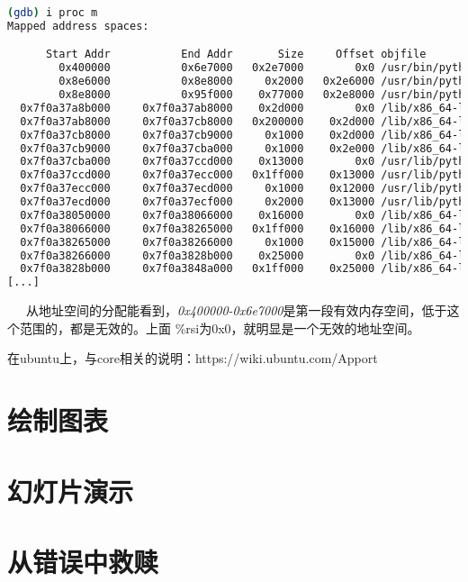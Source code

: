 \documentclass[12pt]{article}  %
\begin{document}
\begin{lstlisting}[language=sh]
(gdb) i proc m
Mapped address spaces:

      Start Addr           End Addr       Size     Offset objfile
        0x400000           0x6e7000   0x2e7000        0x0 /usr/bin/python2.7
        0x8e6000           0x8e8000     0x2000   0x2e6000 /usr/bin/python2.7
        0x8e8000           0x95f000    0x77000   0x2e8000 /usr/bin/python2.7
  0x7f0a37a8b000     0x7f0a37ab8000    0x2d000        0x0 /lib/x86_64-linux-gnu/libncursesw.so.5.9
  0x7f0a37ab8000     0x7f0a37cb8000   0x200000    0x2d000 /lib/x86_64-linux-gnu/libncursesw.so.5.9
  0x7f0a37cb8000     0x7f0a37cb9000     0x1000    0x2d000 /lib/x86_64-linux-gnu/libncursesw.so.5.9
  0x7f0a37cb9000     0x7f0a37cba000     0x1000    0x2e000 /lib/x86_64-linux-gnu/libncursesw.so.5.9
  0x7f0a37cba000     0x7f0a37ccd000    0x13000        0x0 /usr/lib/python2.7/lib-dynload/_curses.x86_64-linux-gnu.so
  0x7f0a37ccd000     0x7f0a37ecc000   0x1ff000    0x13000 /usr/lib/python2.7/lib-dynload/_curses.x86_64-linux-gnu.so
  0x7f0a37ecc000     0x7f0a37ecd000     0x1000    0x12000 /usr/lib/python2.7/lib-dynload/_curses.x86_64-linux-gnu.so
  0x7f0a37ecd000     0x7f0a37ecf000     0x2000    0x13000 /usr/lib/python2.7/lib-dynload/_curses.x86_64-linux-gnu.so
  0x7f0a38050000     0x7f0a38066000    0x16000        0x0 /lib/x86_64-linux-gnu/libgcc_s.so.1
  0x7f0a38066000     0x7f0a38265000   0x1ff000    0x16000 /lib/x86_64-linux-gnu/libgcc_s.so.1
  0x7f0a38265000     0x7f0a38266000     0x1000    0x15000 /lib/x86_64-linux-gnu/libgcc_s.so.1
  0x7f0a38266000     0x7f0a3828b000    0x25000        0x0 /lib/x86_64-linux-gnu/libtinfo.so.5.9
  0x7f0a3828b000     0x7f0a3848a000   0x1ff000    0x25000 /lib/x86_64-linux-gnu/libtinfo.so.5.9
[...]
\end{lstlisting}
\ \ \  从地址空间的分配能看到，\emph{0x400000-0x6e7000}是第一段有效内存空间，低于这个范围的，都是无效的。上面 \%rsi为0x0，就明显是一个无效的地址空间。

在ubuntu上，与core相关的说明：https://wiki.ubuntu.com/Apport
\section{绘制图表} %
\label{sec:绘制图表}
\section{幻灯片演示} %
\label{sec:幻灯片演示}
\section{从错误中救赎} %
\label{sec:从错误中救赎}
\end{document}
